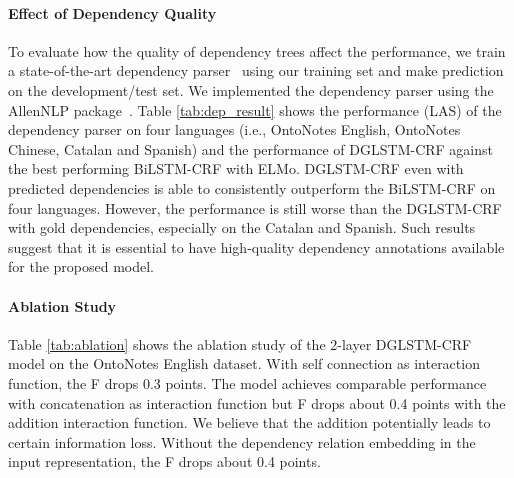 \documentclass[11pt,a4paper]{article}
\begin{document}
\paragraph{Effect of Dependency Quality}
To evaluate how the quality of dependency trees affect the performance, we train a state-of-the-art dependency parser~\cite{dozat2017deep} using our training set and make prediction on the development/test set. 
We implemented the dependency parser using the AllenNLP package~\cite{Gardner2017AllenNLP}.
Table \ref{tab:dep_result} shows the performance (LAS) of the dependency parser on four languages (i.e., OntoNotes English, OntoNotes Chinese, Catalan and Spanish) and the performance of DGLSTM-CRF against the best performing BiLSTM-CRF with ELMo.
DGLSTM-CRF even with predicted dependencies is able to consistently outperform the BiLSTM-CRF on four languages. 
However, the performance is still worse than the DGLSTM-CRF with gold dependencies, especially on the Catalan and Spanish.
Such results suggest that it is essential to have high-quality dependency annotations available for the proposed model.


\paragraph{Ablation Study}
Table \ref{tab:ablation} shows the ablation study of the 2-layer DGLSTM-CRF model on the OntoNotes English dataset.
With self connection as interaction function, the F drops 0.3 points.
The model achieves comparable performance with concatenation as interaction function but  F drops about 0.4 points with the addition interaction function.  
We believe that the addition potentially leads to certain information loss.
Without the dependency relation embedding  in the input representation, the F drops about 0.4 points.
\end{document}
